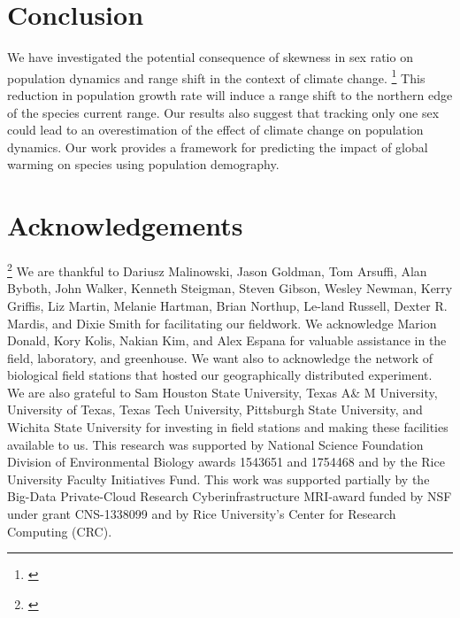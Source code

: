\documentclass[12pt]{article}
\newcommand{\tom}[2]{{\color{red}{#1}}\footnote{\textit{\color{red}{#2}}}}
\begin{document}
\section*{Conclusion}
We have investigated the potential consequence of skewness in sex ratio on population dynamics and range shift in the context of climate change. 
\tom{We found that future climate will affect population growth rate at the center of species range.}{I do not follow what this is referring to.}
This reduction in population growth rate will induce a range shift to the northern edge of the species current range. 
Our results also suggest that tracking only one sex could lead to an overestimation of the effect of climate change on population dynamics. 
Our work  provides a framework for predicting the impact of global warming on species using population demography. 

\section*{Acknowledgements}
\tom{}{Much of this looks like it is copied from the Am Nat paper.}
We are thankful to Dariusz Malinowski, Jason Goldman, Tom Arsuffi, Alan Byboth, John Walker, Kenneth Steigman, Steven Gibson, Wesley Newman, Kerry Griffis, Liz Martin, Melanie Hartman, Brian Northup, Le-land Russell, Dexter R. Mardis, and Dixie Smith for facilitating our fieldwork. 
We acknowledge Marion Donald, Kory Kolis, Nakian Kim, and Alex Espana for valuable assistance in the field, laboratory, and greenhouse. 
We want also to acknowledge the network of biological field stations that hosted our geographically distributed experiment. 
We are also grateful to Sam Houston State University, Texas A\& M University, University of Texas, Texas Tech University, Pittsburgh State University, and Wichita State University for investing in field stations and making these facilities available to us. 
This research was supported by National Science Foundation Division of Environmental Biology awards 1543651 and 1754468 and by the Rice University Faculty Initiatives Fund.
This work was supported partially by the Big-Data Private-Cloud Research Cyberinfrastructure MRI-award funded by NSF under grant CNS-1338099 and by Rice University's Center for Research Computing (CRC).


\newpage


\newpage
\clearpage 
\setcounter{equation}{0}
\setcounter{figure}{0}
\setcounter{section}{0}
\setcounter{table}{0}
\renewcommand{\theequation}{S.\arabic{equation}}
\renewcommand{\thetable}{S-\arabic{table}}
\renewcommand{\thefigure}{S-\arabic{figure}}
\renewcommand{\thesection}{S.\arabic{section}}
\end{document}
